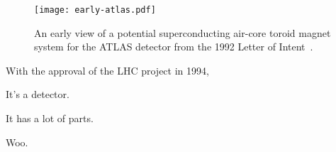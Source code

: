 

\begin{figure}
\centering
\texttt{[image: early-atlas.pdf]}
\label{fig:detector:earlyatlas}
\caption{An early view of a potential superconducting air-core toroid magnet system for the ATLAS detector from the 1992 Letter of Intent~\cite{ATLAS-LoI}.}
\end{figure}


With the approval of the LHC project in 1994,

It's a detector\cite{tdr1}.

It has a lot of parts.

Woo.